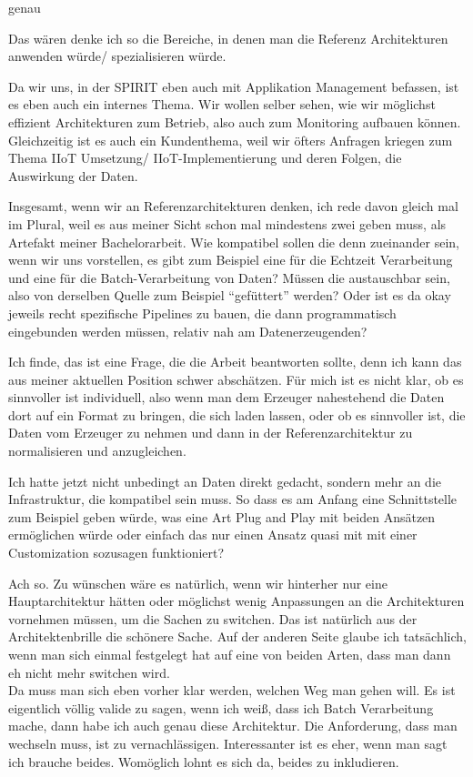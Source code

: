 \PA	 genau

\LF	 Das wären denke ich so die Bereiche, in denen man die Referenz Architekturen anwenden würde/ spezialisieren würde.

\PA	 Da wir uns, in der SPIRIT eben auch mit Applikation Management befassen, ist es eben auch ein internes Thema. Wir wollen selber sehen, wie wir möglichst effizient Architekturen zum Betrieb, also auch zum Monitoring aufbauen können. Gleichzeitig ist es auch ein Kundenthema, weil wir öfters Anfragen kriegen zum Thema \ac{IIoT} Umsetzung/ \ac{IIoT}-Implementierung und deren Folgen, die Auswirkung der Daten.

\LF	Insgesamt, wenn wir an Referenzarchitekturen denken, ich rede davon gleich mal im Plural, weil es aus meiner Sicht schon mal mindestens zwei geben muss, als Artefakt meiner Bachelorarbeit. Wie kompatibel sollen die denn zueinander sein, wenn wir uns vorstellen, es gibt zum Beispiel eine für die Echtzeit Verarbeitung und eine für die Batch-Verarbeitung von Daten? Müssen die austauschbar sein, also von derselben Quelle zum Beispiel \enquote{gefüttert} werden? Oder ist es da okay jeweils recht spezifische Pipelines zu bauen, die  dann programmatisch eingebunden werden müssen, relativ nah am Datenerzeugenden?

\PA	 Ich finde, das ist eine Frage, die die Arbeit beantworten sollte, denn ich kann das aus meiner aktuellen Position schwer abschätzen. Für mich ist es nicht klar, ob es sinnvoller ist individuell, also wenn man dem Erzeuger nahestehend die Daten dort auf ein Format zu bringen, die sich laden lassen, oder ob es sinnvoller ist, die Daten vom Erzeuger zu nehmen und dann in der Referenzarchitektur zu normalisieren und anzugleichen.

\LF	 Ich hatte jetzt nicht unbedingt an Daten direkt gedacht, sondern mehr an die Infrastruktur, die kompatibel sein muss. So dass es am Anfang eine Schnittstelle zum Beispiel geben würde, was eine Art Plug and Play mit beiden Ansätzen ermöglichen würde oder einfach das nur einen Ansatz quasi mit mit einer Customization sozusagen funktioniert?

\PA	Ach so. Zu wünschen wäre es natürlich, wenn wir hinterher nur eine Hauptarchitektur hätten oder möglichst wenig Anpassungen an die Architekturen vornehmen müssen, um die Sachen zu switchen. Das ist natürlich aus der Architektenbrille die schönere Sache. Auf der anderen Seite glaube ich tatsächlich, wenn man sich einmal festgelegt hat auf eine von beiden Arten, dass man dann eh nicht mehr switchen wird. \\
Da muss man sich eben vorher klar werden, welchen Weg man gehen will. Es ist eigentlich völlig valide zu sagen, wenn ich weiß, dass ich Batch Verarbeitung mache, dann habe ich auch genau diese Architektur. Die Anforderung, dass man wechseln muss, ist zu vernachlässigen. Interessanter ist es eher, wenn man sagt ich brauche beides. Womöglich lohnt es sich da, beides zu inkludieren.

